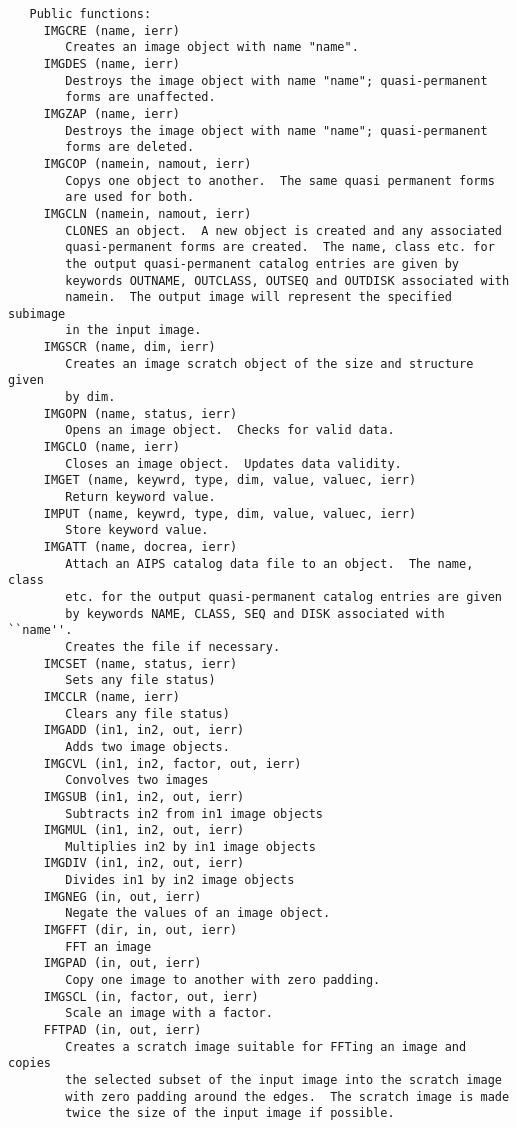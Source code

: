 {\begin{verbatim}
   Public functions:
     IMGCRE (name, ierr)
        Creates an image object with name "name".
     IMGDES (name, ierr)
        Destroys the image object with name "name"; quasi-permanent
        forms are unaffected.
     IMGZAP (name, ierr)
        Destroys the image object with name "name"; quasi-permanent
        forms are deleted.
     IMGCOP (namein, namout, ierr)
        Copys one object to another.  The same quasi permanent forms
        are used for both.
     IMGCLN (namein, namout, ierr)
        CLONES an object.  A new object is created and any associated
        quasi-permanent forms are created.  The name, class etc. for
        the output quasi-permanent catalog entries are given by
        keywords OUTNAME, OUTCLASS, OUTSEQ and OUTDISK associated with
        namein.  The output image will represent the specified subimage
        in the input image.
     IMGSCR (name, dim, ierr)
        Creates an image scratch object of the size and structure given
        by dim.
     IMGOPN (name, status, ierr)
        Opens an image object.  Checks for valid data.
     IMGCLO (name, ierr)
        Closes an image object.  Updates data validity.
     IMGET (name, keywrd, type, dim, value, valuec, ierr)
        Return keyword value.
     IMPUT (name, keywrd, type, dim, value, valuec, ierr)
        Store keyword value.
     IMGATT (name, docrea, ierr)
        Attach an AIPS catalog data file to an object.  The name, class
        etc. for the output quasi-permanent catalog entries are given
        by keywords NAME, CLASS, SEQ and DISK associated with ``name''.
        Creates the file if necessary.
     IMCSET (name, status, ierr)
        Sets any file status)
     IMCCLR (name, ierr)
        Clears any file status)
     IMGADD (in1, in2, out, ierr)
        Adds two image objects.
     IMGCVL (in1, in2, factor, out, ierr)
        Convolves two images
     IMGSUB (in1, in2, out, ierr)
        Subtracts in2 from in1 image objects
     IMGMUL (in1, in2, out, ierr)
        Multiplies in2 by in1 image objects
     IMGDIV (in1, in2, out, ierr)
        Divides in1 by in2 image objects
     IMGNEG (in, out, ierr)
        Negate the values of an image object.
     IMGFFT (dir, in, out, ierr)
        FFT an image
     IMGPAD (in, out, ierr)
        Copy one image to another with zero padding.
     IMGSCL (in, factor, out, ierr)
        Scale an image with a factor.
     FFTPAD (in, out, ierr)
        Creates a scratch image suitable for FFTing an image and copies
        the selected subset of the input image into the scratch image
        with zero padding around the edges.  The scratch image is made
        twice the size of the input image if possible.


\end{verbatim}}
